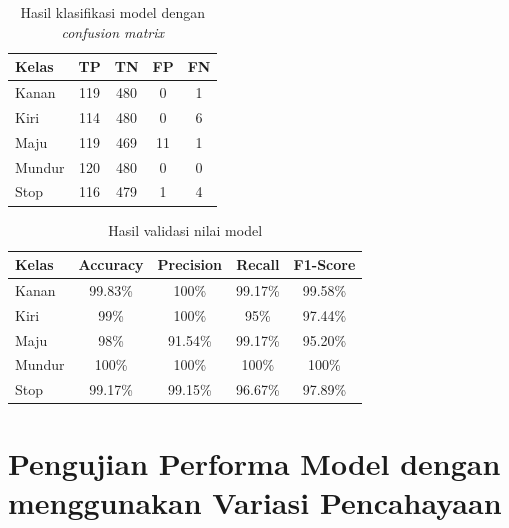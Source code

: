 \begin{longtable}{|l|c|c|c|c|}
  \caption{Hasil klasifikasi model dengan \emph{confusion matrix}}
  \label{tb:cm_model6} \\
  \hline
  \rowcolor[HTML]{C0C0C0} 
  \textbf{Kelas} & \textbf{TP} & \textbf{TN} & \textbf{FP} & \textbf{FN} \\ \hline
  Kanan    & 119          & 480         & 0           & 1           \\ \hline
  Kiri      & 114          & 480         & 0           & 6           \\ \hline
  Maju      & 119          & 469         & 11           & 1           \\ \hline
  Mundur     & 120          & 480         & 0           & 0           \\ \hline
  Stop  & 116          & 479         & 1           & 4           \\ \hline
\end{longtable}

\begin{longtable}{|l|c|c|c|c|}
  \caption{Hasil validasi nilai model}
  \label{tb:vs_model6} \\
  \hline
  \rowcolor[HTML]{C0C0C0} 
  \textbf{Kelas} & \textbf{Accuracy} & \textbf{Precision} & \textbf{Recall} & \textbf{F1-Score} \\ \hline
  Kanan    & 99.83\%            & 100\%             & 99.17\%           & 99.58\%            \\ \hline
  Kiri     & 99\%          & 100\%           & 95\%           & 97.44\%           \\ \hline
  Maju      & 98\%          & 91.54\%           & 99.17\%          & 95.20\%          \\ \hline
  Mundur     & 100\%            & 100\%             & 100\%           & 100\%            \\ \hline
  Stop  & 99.17\%            & 99.15\%             & 96.67\%           & 97.89\%            \\ \hline
\end{longtable}

\section{Pengujian Performa Model dengan menggunakan Variasi Pencahayaan}

